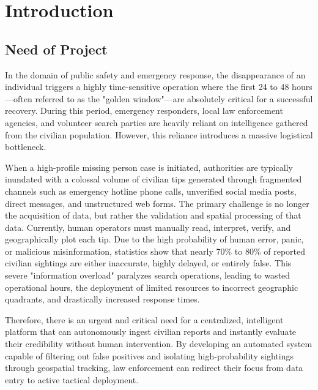 \documentclass[12pt,a4paper]{report}
\begin{document}
\newpage
\tableofcontents
\newpage
\listoftables
\newpage
\listoffigures
\newpage


\chapter{Introduction}

\section{Need of Project}
In the domain of public safety and emergency response, the disappearance of an individual triggers a highly time-sensitive operation where the first 24 to 48 hours—often referred to as the "golden window"—are absolutely critical for a successful recovery. During this period, emergency responders, local law enforcement agencies, and volunteer search parties are heavily reliant on intelligence gathered from the civilian population. However, this reliance introduces a massive logistical bottleneck. 

When a high-profile missing person case is initiated, authorities are typically inundated with a colossal volume of civilian tips generated through fragmented channels such as emergency hotline phone calls, unverified social media posts, direct messages, and unstructured web forms. The primary challenge is no longer the acquisition of data, but rather the validation and spatial processing of that data. Currently, human operators must manually read, interpret, verify, and geographically plot each tip. Due to the high probability of human error, panic, or malicious misinformation, statistics show that nearly 70\% to 80\% of reported civilian sightings are either inaccurate, highly delayed, or entirely false. This severe "information overload" paralyzes search operations, leading to wasted operational hours, the deployment of limited resources to incorrect geographic quadrants, and drastically increased response times. 

Therefore, there is an urgent and critical need for a centralized, intelligent platform that can autonomously ingest civilian reports and instantly evaluate their credibility without human intervention. By developing an automated system capable of filtering out false positives and isolating high-probability sightings through geospatial tracking, law enforcement can redirect their focus from data entry to active tactical deployment.
\end{document}
